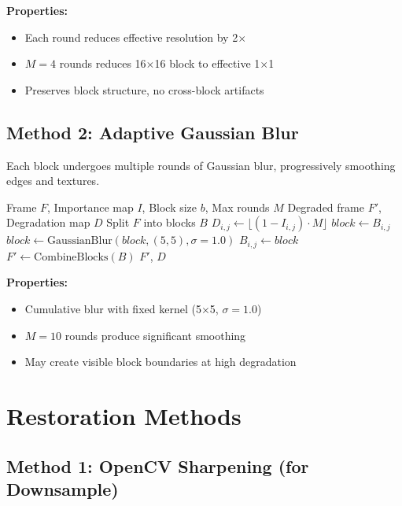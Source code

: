 \documentclass[11pt,a4paper]{article}
\begin{document}
\textbf{Properties:}
\begin{itemize}
    \item Each round reduces effective resolution by 2$\times$
    \item $M=4$ rounds reduces 16$\times$16 block to effective 1$\times$1
    \item Preserves block structure, no cross-block artifacts
\end{itemize}

\subsection{Method 2: Adaptive Gaussian Blur}

Each block undergoes multiple rounds of Gaussian blur, progressively smoothing edges and textures.

\begin{algorithm}[H]
\caption{Adaptive Blur Degradation}
\begin{algorithmic}[1]
\Require Frame $F$, Importance map $I$, Block size $b$, Max rounds $M$
\Ensure Degraded frame $F'$, Degradation map $D$
\State Split $F$ into blocks $B$
\State $D_{i,j} \gets \lfloor (1 - I_{i,j}) \cdot M \rfloor$
        \State $block \gets B_{i,j}$
            \State $block \gets \text{GaussianBlur}(block, (5,5), \sigma=1.0)$
        \EndFor
        \State $B_{i,j} \gets block$
    \EndIf
\EndFor
\State $F' \gets \text{CombineBlocks}(B)$
\State \Return $F'$, $D$
\end{algorithmic}
\end{algorithm}

\textbf{Properties:}
\begin{itemize}
    \item Cumulative blur with fixed kernel (5$\times$5, $\sigma=1.0$)
    \item $M=10$ rounds produce significant smoothing
    \item May create visible block boundaries at high degradation
\end{itemize}

\section{Restoration Methods}

\subsection{Method 1: OpenCV Sharpening (for Downsample)}
\end{document}
